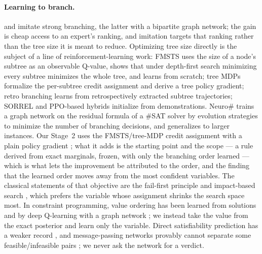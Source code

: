 \documentclass[final,5p,times,twocolumn]{elsarticle}
\begin{document}
\paragraph{Learning to branch.} \citet{khalil2016learning} and \citet{gasse2019exact} imitate strong branching, the latter with a bipartite graph network; the gain is cheap access to an expert's ranking, and imitation targets that ranking rather than the tree size it is meant to reduce. Optimizing tree size directly is the subject of a line of reinforcement-learning work: FMSTS \citep{etheve2020reinforcement} uses the size of a node's subtree as an observable Q-value, shows that under depth-first search minimizing every subtree minimizes the whole tree, and learns from scratch; tree MDPs \citep{scavuzzo2022learning} formalize the per-subtree credit assignment and derive a tree policy gradient; retro branching \citep{parsonson2023reinforcement} learns from retrospectively extracted subtree trajectories; SORREL \citep{sorrel2025} and PPO-based hybrids initialize from demonstrations. Neuro\# \citep{vaezipoor2021learning} trains a graph network on the residual formula of a \#SAT solver by evolution strategies to minimize the number of branching decisions, and generalizes to larger instances. Our Stage~2 uses the FMSTS/tree-MDP credit assignment with a plain policy gradient \citep{williams1992simple}; what it adds is the starting point and the scope --- a rule derived from exact marginals, frozen, with only the branching order learned --- which is what lets the improvement be attributed to the order, and the finding that the learned order moves away from the most confident variables. The classical statements of that objective are the fail-first principle \citep{haralick1980increasing} and impact-based search \citep{refalo2004impact}, which prefers the variable whose assignment shrinks the search space most. In constraint programming, value ordering has been learned from solutions \citep{chu2015learning} and by deep Q-learning with a graph network \citep{cappart2021combining}; we instead take the value from the exact posterior and learn only the variable. Direct satisfiability prediction has a weaker record \citep{selsam2019neurosat,li2023g4satbench}, and message-passing networks provably cannot separate some feasible/infeasible pairs \citep{chen2023representing}; we never ask the network for a verdict.
\end{document}
